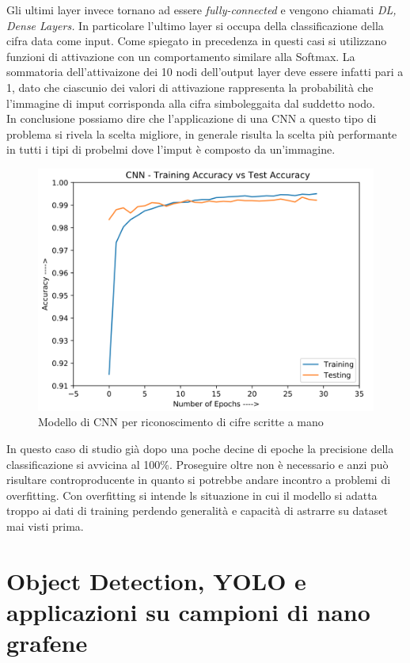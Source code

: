 \documentclass[12pt,a4paper,openright,twoside]{report}
\begin{document}
Gli ultimi layer invece tornano ad essere \emph{fully-connected} e vengono chiamati \emph{DL, Dense Layers.}
In particolare l'ultimo layer si occupa della classificazione della cifra data come input. Come spiegato in precedenza in questi casi si utilizzano funzioni di attivazione con un comportamento similare alla Softmax. La sommatoria dell'attivaizone dei 10 nodi dell'output layer deve essere infatti pari a 1, dato che ciascunio dei valori di attivazione rappresenta la probabilità che l'immagine di imput corrisponda alla cifra simboleggaita dal suddetto nodo.\\
\newpage
In conclusione possiamo dire che l'applicazione di una CNN a questo tipo di problema si rivela la scelta migliore, in generale risulta la scelta più performante in tutti i tipi di probelmi dove l'imput è composto da un'immagine.\\
\begin{figure}[h]
\centering
\includegraphics[width=\linewidth]{cnn_perf.png}
\caption{Modello di CNN per riconoscimento di cifre scritte a mano}
\end{figure}
In questo caso di studio già dopo una poche decine di epoche la precisione della classificazione si avvicina al 100\%.
Proseguire oltre non è necessario e anzi può risultare controproducente in quanto si potrebbe andare incontro a problemi di overfitting.
Con overfitting si intende ls situazione in cui il modello si adatta troppo ai dati di training perdendo generalità e capacità di astrarre su dataset mai visti prima. \\

{\let\clearpage\relax \chapter{Object Detection, YOLO e applicazioni su campioni di nano grafene}}
\end{document}
